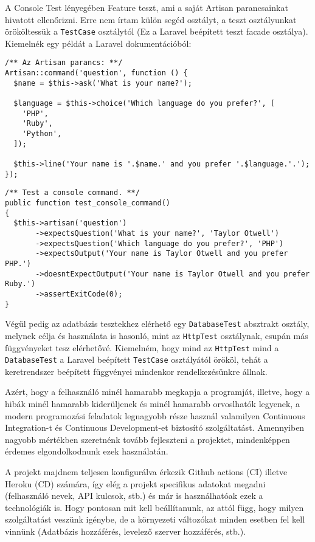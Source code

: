 \documentclass[a4paper,12pt]{thesis-ekf}
\theoremstyle{definition}
\begin{document}
		A Console Test lényegében Feature teszt, ami a saját Artisan parancsainkat hivatott ellenőrizni. Erre nem írtam külön segéd osztályt, a teszt osztályunkat örököltessük a \verb|TestCase| osztálytól (Ez a Laravel beépített teszt facade osztálya). Kiemelnék egy példát a Laravel dokumentációból:
		
\begin{lstlisting}[caption={Egy példa Artisan parancs}]
/** Az Artisan parancs: **/
Artisan::command('question', function () {
  $name = $this->ask('What is your name?');

  $language = $this->choice('Which language do you prefer?', [
    'PHP',
    'Ruby',
    'Python',
  ]);

  $this->line('Your name is '.$name.' and you prefer '.$language.'.');
});
\end{lstlisting}

\begin{lstlisting}[caption={A fenti parancs tesztelése}]
/** Test a console command. **/
public function test_console_command()
{
  $this->artisan('question')
       ->expectsQuestion('What is your name?', 'Taylor Otwell')
       ->expectsQuestion('Which language do you prefer?', 'PHP')
       ->expectsOutput('Your name is Taylor Otwell and you prefer PHP.')
       ->doesntExpectOutput('Your name is Taylor Otwell and you prefer Ruby.')
       ->assertExitCode(0);
}
\end{lstlisting}

		Végül pedig az adatbázis tesztekhez elérhető egy \verb|DatabaseTest| absztrakt osztály, melynek célja és használata is hasonló, mint az \verb|HttpTest| osztálynak, csupán más függvényeket tesz elérhetővé. Kiemelném, hogy mind az \verb|HttpTest| mind a \verb|DatabaseTest| a Laravel beépített \verb|TestCase| osztályától örököl, tehát a keretrendszer beépített függvényei mindenkor rendelkezésünkre állnak.
		
		Azért, hogy a felhasználó minél hamarabb megkapja a programját, illetve, hogy a hibák minél hamarabb kiderüljenek és minél hamarabb orvoslhatók legyenek, a modern programozási feladatok legnagyobb része használ valamilyen Continuous Integration-t és Continuous Development-et biztosító szolgáltatást. Amennyiben nagyobb mértékben szeretnénk tovább fejleszteni a projektet, mindenképpen érdemes elgondolkodnunk ezek használatán.
		
		A projekt majdnem teljesen konfigurálva érkezik Github actions (CI) illetve Heroku (CD) számára, így elég a projekt specifikus adatokat megadni (felhasználó nevek, API kulcsok, stb.) és már is használhatóak ezek a technológiák is. Hogy pontosan mit kell beállítanunk, az attól függ, hogy milyen szolgáltatást veszünk igénybe, de a környezeti változókat minden esetben fel kell vinnünk (Adatbázis hozzáférés, levelező szerver hozzáférés, stb.).
		
\end{document}
